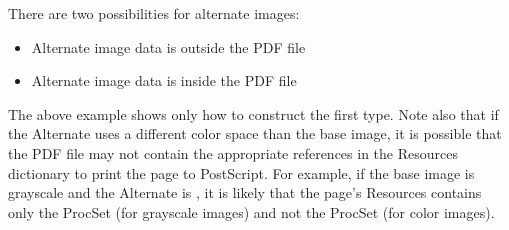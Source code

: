 \documentclass[letterpaper,12pt,english,openany,oneside]{sphinxmanual}
\begin{document}
\begin{sphinxVerbatim}[commandchars=\\\{\}]
\PYG{p}{[}   
               
             
              
     

        

    \PYG{p}{[}   
            \PYG{p}{[}      \PYG{p}{]}
     
\end{sphinxVerbatim}

There are two possibilities for alternate images:
\begin{itemize}
\item {} 
Alternate image data is outside the PDF file

\item {} 
Alternate image data is inside the PDF file

\end{itemize}

The above example shows only how to construct the first type. Note also that if the Alternate uses a different color space than the base image, it is possible that the PDF file may not contain the appropriate  references in the Resources dictionary to print the page to PostScript. For example, if the base image is grayscale and the Alternate is  , it is likely that the page’s Resources contains only the  ProcSet (for grayscale images) and not the  ProcSet (for color images).
\end{document}
